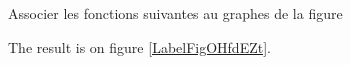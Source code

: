
\begin{exercice}\label{exosmath-0334}

    Associer les fonctions suivantes au graphes de la figure 


The result is on figure \ref{LabelFigOHfdEZt}. %
\newcommand{\CaptionFigOHfdEZt}{<+Type your caption here+>}



\end{exercice}
